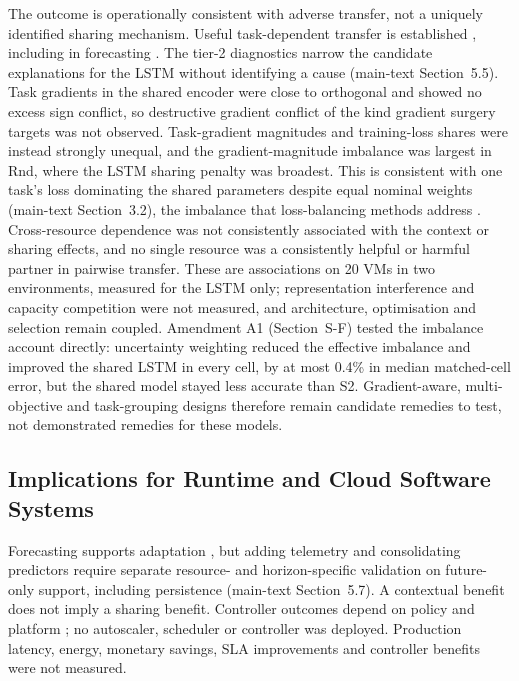 \documentclass[a4paper,11pt]{article}
\begin{document}
The outcome is operationally consistent with adverse transfer, not a uniquely
identified sharing mechanism. Useful task-dependent transfer is established
\citep{Caruana1997Multitask,Standley2020TaskGrouping,Fifty2021TaskGroupings},
including in forecasting \citep{Nikentari2022NARMAXLSTM,Nochumsohn2025MTLinear}.
The tier-2 diagnostics narrow the candidate explanations for the LSTM
without identifying a cause (main-text Section~5.5). Task
gradients in the shared encoder were close to orthogonal and showed no
excess sign conflict, so destructive gradient conflict of the kind gradient
surgery targets \citep{Yu2020GradientSurgery} was not observed. Task-gradient
magnitudes and training-loss shares were instead strongly unequal, and the
gradient-magnitude imbalance was largest in Rnd, where the LSTM sharing
penalty was broadest. This is consistent
with one task's loss dominating the shared parameters despite equal nominal
weights (main-text Section~3.2), the imbalance that loss-balancing methods
address \citep{Chen2018GradNorm}. Cross-resource dependence was not
consistently associated with the context or sharing effects, and no single resource was a consistently
helpful or harmful partner in pairwise transfer. These are associations on
20 VMs in two environments, measured for the LSTM only; representation
interference and capacity competition were not measured, and architecture,
optimisation and selection remain coupled. Amendment A1 (Section~S-F) tested
the imbalance account directly: uncertainty weighting reduced the effective
imbalance and improved the shared LSTM in every cell, by at most 0.4\% in
median matched-cell error, but the shared model stayed less accurate than S2.
Gradient-aware, multi-objective and task-grouping designs
\citep{Sener2018MultiObjective,Yu2020GradientSurgery,Fifty2021TaskGroupings}
therefore remain candidate remedies to test, not demonstrated remedies for these
models.

\subsection*{Implications for Runtime and Cloud Software Systems}


Forecasting supports adaptation \citep{Taherizadeh2018Monitoring,Bauer2020SelfAware},
but adding telemetry and consolidating predictors require separate resource-
and horizon-specific validation on future-only support, including persistence
(main-text Section~5.7). A contextual benefit does not imply a
sharing benefit. Controller outcomes depend on policy and platform
\citep{Qu2018Autoscaling}; no autoscaler, scheduler or controller was deployed.
Production latency, energy, monetary savings, SLA improvements and controller
benefits were not measured.
\end{document}

